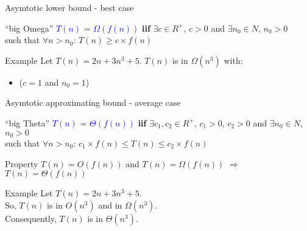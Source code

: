 \documentclass[english,10pt,table]{beamer}
\begin{document}
\begin{frame}{Asymtotic lower bound - best case}
	
	\begin{block}{``big Omega''}\small
		\textcolor{blue}{$T(n)$ = \alert{$\Omega$}$(f(n))$} \textbf{iif} 
		\alert{$\exists c \in R^+$}, \alert{$c>0$} and \alert{$\exists n_0 \in N$}, \alert{$n_0>0$}\\
		such that \alert{$\forall n>n_0$}: \alert{$T(n) \geq c \times f(n) $}
 \end{block}	
	\pause
		\begin{block}{Example}\small
		Let \alert{$T(n) = 2n+3n^3 + 5$}. \alert{$T(n)$} is in \alert{$\Omega(n^3)$} with:
	 \begin{itemize}
     \item (\alert{$c=1$} and \alert{$n_0=1$}) 
		\end{itemize}
 \end{block}	
\end{frame}


\begin{frame}{Asymtotic approximating bound - average case}
	
	\begin{block}{``big Theta''}
  \textcolor{blue}{$T(n)$ = \alert{$\Theta$}$(f(n))$} \textbf{iif}
		\alert{$\exists c_1, c_2 \in R^+$}, \alert{$c_1>0$}, \alert{$c_2>0$} and \alert{$\exists n_0 \in N$}, \alert{$n_0>0$}\\
		such that \alert{$\forall n>n_0$}: \alert{$c_1 \times f(n) \leq T(n) \leq c_2 \times f(n) $}
 \end{block}	
		\pause
		\begin{block}{Property}\small
		\alert{$T(n) = O(f(n))$} and \alert{$T(n) = \Omega(f(n))$} $\Longrightarrow$ \alert{$T(n) = \Theta(f(n))$}
 \end{block}	
	\pause
	\begin{block}{Example}\small
		Let \alert{$T(n) = 2n+3n^3 + 5$}. \\
		So, \alert{$T(n)$} is in \alert{$O(n^3)$} and in \alert{$\Omega(n^3)$}.\\
		Consequently, \alert{$T(n)$} is in \alert{$\Theta(n^3)$}.
 \end{block}	
\end{frame}
\end{document}
